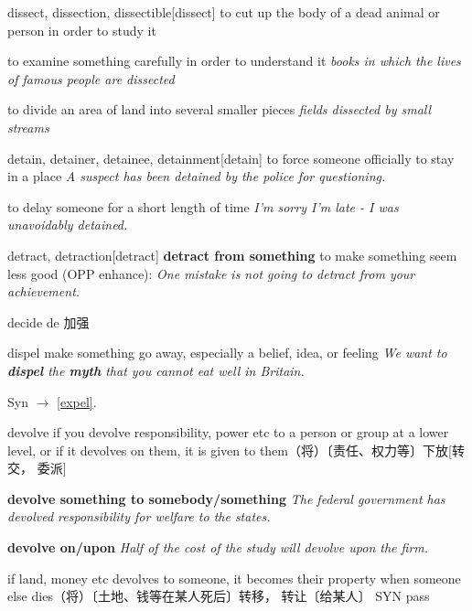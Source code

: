 \begin{DefWord}{dissect, dissection, dissectible}[dissect]
    to cut up the body of a dead animal or person in order to study it

    to examine something carefully in order to understand it
    \textit{books in which the lives of famous people are dissected}

    to divide an area of land into several smaller pieces
    \textit{fields dissected by small streams}
\end{DefWord}

\begin{DefWord}{detain, detainer, detainee, detainment}[detain]
    to force someone officially to stay in a place
    \textit{A suspect has been detained by the police for questioning.}

    to delay someone for a short length of time
\textit{I'm sorry I'm late - I was unavoidably detained.}
\end{DefWord}

\begin{DefWord}{detract, detraction}[detract]
    \textbf{detract from something}
    to make something seem less good (OPP  enhance):
    \textit{One mistake is not going to detract from your achievement.}
\end{DefWord}

\begin{DefWord}{decide}
    de 加强
\end{DefWord}

\begin{DefWord}{dispel}
    make something go away, especially a belief, idea, or feeling
    \textit{We want to \textbf{dispel} the \textbf{myth} that you cannot eat well in Britain.}

    Syn $\rightarrow$ \ref{expel}.
\end{DefWord}

\begin{DefWord}{devolve}
    if you devolve responsibility, power etc to a person or group at a lower level, or if it devolves on them, it is given to them（将）〔责任、权力等〕下放[转交， 委派]

    \textbf{devolve something to somebody/something}
    \textit{The federal government has devolved responsibility for welfare to the states.}

    \textbf{devolve on/upon}
    \textit{Half of the cost of the study will devolve upon the firm.}

    if land, money etc devolves to someone, it becomes their property when someone else dies（将）〔土地、钱等在某人死后〕转移， 转让〔给某人〕 SYN  pass
\end{DefWord}


